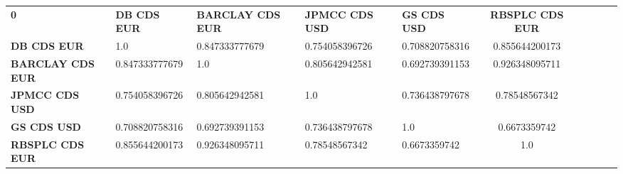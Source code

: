 \begin{center}
 \begin{tabular}{|l|l|l|l|l|c|c|c|c|c|}
\hline
\textbf{0} & \textbf{DB CDS EUR} & \textbf{BARCLAY CDS EUR} & \textbf{JPMCC CDS USD} & \textbf{GS CDS USD} & \textbf{RBSPLC CDS EUR}\\\hhline{|=|=|=|=|=|=|}
\textbf{DB CDS EUR} & 1.0 & 0.847333777679 & 0.754058396726 & 0.708820758316 & 0.855644200173\\
\textbf{BARCLAY CDS EUR} & 0.847333777679 & 1.0 & 0.805642942581 & 0.692739391153 & 0.926348095711\\
\textbf{JPMCC CDS USD} & 0.754058396726 & 0.805642942581 & 1.0 & 0.736438797678 & 0.78548567342\\
\textbf{GS CDS USD} & 0.708820758316 & 0.692739391153 & 0.736438797678 & 1.0 & 0.6673359742\\
\textbf{RBSPLC CDS EUR} & 0.855644200173 & 0.926348095711 & 0.78548567342 & 0.6673359742 & 1.0\\
\hline
\end{tabular}
\end{center}
